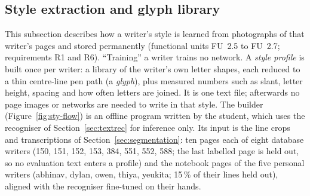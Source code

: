 
\subsection{Style extraction and glyph library}
\label{sec:styleprofile}

This subsection describes how a writer's style is learned from photographs of that writer's pages and stored permanently (functional units FU~2.5 to FU~2.7; requirements R1 and R6).
``Training'' a writer trains no network.
A \emph{style profile} is built once per writer: a library of the writer's own letter shapes, each reduced to a thin centre-line pen path (a \emph{glyph}), plus measured numbers such as slant, letter height, spacing and how often letters are joined.
It is one text file; afterwards no page images or networks are needed to write in that style.
The builder (Figure~\ref{fig:sty-flow}) is an offline program written by the student, which uses the recogniser of Section~\ref{sec:textrec} for inference only.
Its input is the line crops and transcriptions of Section~\ref{sec:segmentation}: ten pages each of eight database writers (150, 151, 152, 153, 384, 551, 552, 588; the last labelled page is held out, so no evaluation text enters a profile) and the notebook pages of the five personal writers (abhinav, dylan, owen, thiya, yeukita; 15\,\% of their lines held out), aligned with the recogniser fine-tuned on their hands.

